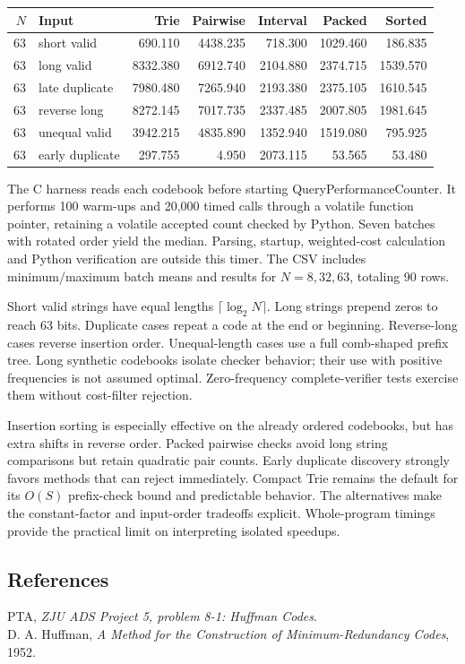 \documentclass[11pt,a4paper]{article}
\begin{document}
{\small
\begin{tabular}{@{}rlrrrrr@{}}
\toprule
$N$ & Input & Trie & Pairwise & Interval & Packed & Sorted\\
\midrule
63 & short valid & 690.110 & 4438.235 & 718.300 & 1029.460 & 186.835\\
63 & long valid & 8332.380 & 6912.740 & 2104.880 & 2374.715 & 1539.570\\
63 & late duplicate & 7980.480 & 7265.940 & 2193.380 & 2375.105 & 1610.545\\
63 & reverse long & 8272.145 & 7017.735 & 2337.485 & 2007.805 & 1981.645\\
63 & unequal valid & 3942.215 & 4835.890 & 1352.940 & 1519.080 & 795.925\\
63 & early duplicate & 297.755 & 4.950 & 2073.115 & 53.565 & 53.480\\
\bottomrule
\end{tabular}
}

The C harness reads each codebook before starting QueryPerformanceCounter. It performs 100 warm-ups and 20,000 timed calls through a volatile function pointer, retaining a volatile accepted count checked by Python. Seven batches with rotated order yield the median. Parsing, startup, weighted-cost calculation and Python verification are outside this timer. The CSV includes minimum/maximum batch means and results for $N=8,32,63$, totaling 90 rows.

Short valid strings have equal lengths $\lceil\log_2N\rceil$. Long strings prepend zeros to reach 63 bits. Duplicate cases repeat a code at the end or beginning. Reverse-long cases reverse insertion order. Unequal-length cases use a full comb-shaped prefix tree. Long synthetic codebooks isolate checker behavior; their use with positive frequencies is not assumed optimal. Zero-frequency complete-verifier tests exercise them without cost-filter rejection.

Insertion sorting is especially effective on the already ordered codebooks, but has extra shifts in reverse order. Packed pairwise checks avoid long string comparisons but retain quadratic pair counts. Early duplicate discovery strongly favors methods that can reject immediately. Compact Trie remains the default for its $O(S)$ prefix-check bound and predictable behavior. The alternatives make the constant-factor and input-order tradeoffs explicit. Whole-program timings provide the practical limit on interpreting isolated speedups.

\subsection*{References}
PTA, \emph{ZJU ADS Project 5, problem 8-1: Huffman Codes}.\\
D. A. Huffman, \emph{A Method for the Construction of Minimum-Redundancy Codes}, 1952.
\end{document}

